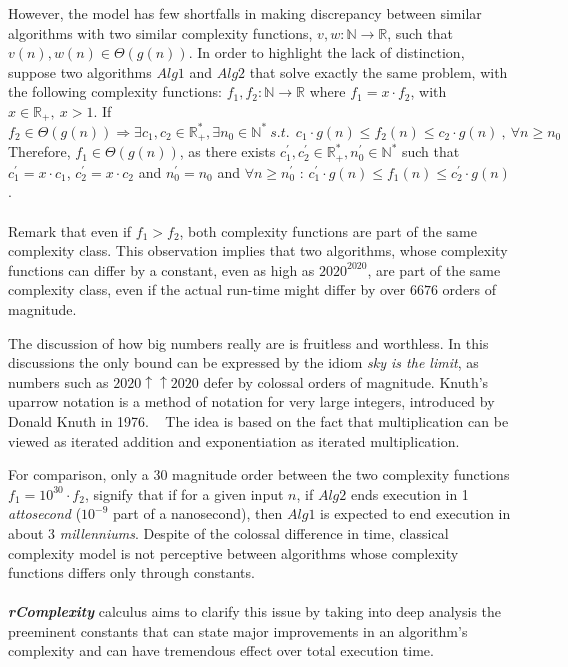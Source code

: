 However, the model has few shortfalls in making discrepancy between similar algorithms with two similar complexity functions, $v,w:\mathbb{N}\longrightarrow\mathbb{R}$, such that $v(n),w(n) \in \Theta(g(n))$. In order to highlight the lack of distinction, suppose two algorithms $Alg1$ and $Alg2$ that solve exactly the same problem, with the following complexity functions:
$f_{1},f_{2}:\mathbb{N}\longrightarrow\mathbb{R}$ where $f_{1} = x \cdot f_{2}$, with $x \in \mathbb{R}_{+}, \ x > 1$.
If \[ f_{2} \in \Theta(g(n)) \Rightarrow \exists c_{1}, c_{2} \in \mathbb{R}^{*}_{+}, \exists n_{0} \in \mathbb{N}^{*}\ s.t.\ \ c_{1} \cdot g(n) \leq f_{2}(n) \leq c_{2} \cdot g(n)\ ,\  \forall n \geq n_{0} \]
Therefore, $f_{1} \in \Theta(g(n))$, as there exists $ c_{1}^{'}, c_{2}^{'} \in \mathbb{R}^{*}_{+}, n_{0}^{'} \in \mathbb{N}^{*}$ such that $ c_{1}^{'} = x \cdot c_{1} $, $ c_{2}^{'} = x \cdot c_{2} $ and $n_{0}^{'} = n_{0}$ and  $\forall n \geq n_{0}^{'} $ :  $c_{1}^{'} \cdot g(n) \leq f_{1}(n) \leq c_{2}^{'} \cdot g(n)$.
\\ \\
Remark that even if $f_{1} > f_{2}$, both complexity functions are part of the same complexity class. This observation implies that two algorithms, whose complexity functions can differ by a constant, even as high as $2020^{2020}$, are part of the same complexity class, even if the actual run-time might differ by over $6676$ orders of magnitude.

\begin{remark}
    The discussion of how big numbers really are is fruitless and worthless. In this discussions the only bound can be expressed by the idiom \textit{sky is the limit}, as numbers such as $2020 \uparrow \uparrow 2020$ defer by colossal orders of magnitude. Knuth's up\-arrow notation is a method of notation for very large integers, introduced by Donald Knuth in 1976. ~\cite{knuth1976mathematics} The idea is based on the fact that multiplication can be viewed as iterated addition and exponentiation as iterated multiplication.
\end{remark}


For comparison, only a $30$ magnitude order between the two complexity functions $f_{1} = 10^{30} \cdot f_{2}$, signify
that if for a given input $n$, if $Alg2$ ends execution in 1 \textit{attosecond} ($10^{-9}$ part of a nanosecond), then $Alg1$ is expected to end execution in about 3 \textit{millenniums}. Despite of the colossal difference in time, classical complexity model is not perceptive between algorithms whose complexity functions differs only through constants. \\ \\
\textbf{\textit{rComplexity}} calculus aims to clarify this issue by taking into deep analysis the preeminent constants that can state major improvements in an algorithm's complexity and can have tremendous effect over total execution time.


